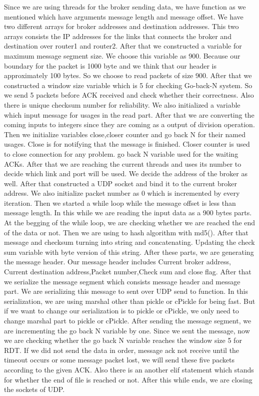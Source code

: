 \documentclass[conference]{IEEEtran}
\begin{document}
Since we are using threads for the broker sending data, we have function as we mentioned which have arguments message length and message offset. We have two different arrays for broker addresses and destination addresses. This two arrays consists the IP addresses for the links that connects the broker and destination over router1 and router2. After that we constructed a variable for maximum message segment size. We choose this variable as 900. Because our boundary for the packet is 1000 byte and we think that our header is approximately 100 bytes. So we choose to read packets of size 900. After that we constructed a window size variable which is 5 for checking Go-back-N system. So we send 5 packets before ACK received and check whether their correctness. Also there is unique checksum number for reliability. We also initialized a variable which input message for usages in the read part. After that we are converting the coming inputs to integers since they are coming as a output of division operation. Then we initialize variables close,closer counter and go back N for their named usages. Close is for notifying that the message is finished. Closer counter is used to close connection for any problem. go back N variable used for the waiting ACKs. After that we are reaching the current threads and uses its number to decide which link and port will be used. We decide the address of the broker as well. After that constructed a UDP socket and bind it to the current broker address. We also initialize packet number as 0 which is incremented by every iteration. Then we started a while loop while the message offset is less than message length. In this while we are reading the input data as a 900 bytes parts. At the begging of the while loop, we are checking whether we are reached the end of the data or not. Then we are using to hash algorithm with md5(). After that message and checksum turning into string and concatenating. Updating the check sum variable with byte version of this string. After these parts, we are generating the message header. Our message header includes Current broker address, Current destination address,Packet number,Check sum and close flag. After that we serialize the message segment which consists message header and message part. We are serializing this message to sent over UDP send to function. In this serialization, we are using marshal other than pickle or cPickle for being fast. But if we want to change our serialization is to pickle or cPickle, we only need to change marshal part to pickle or cPickle.
After sending the message segment, we are incrementing the go back N variable by one. Since we sent the message, now we are checking whether the go back N variable reaches the window size 5 for RDT. If we did not send the data in order, message ack not receive until the timeout occurs or some message packet lost, we will send these five packets according to the given ACK. Also there is an another elif statement which stands for whether the end of file is reached or not. After this while ends, we are closing the sockets of UDP. 
\end{document}
